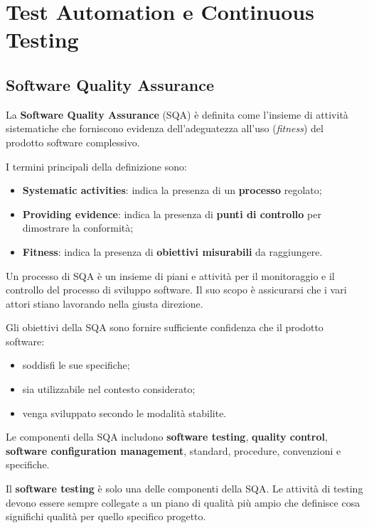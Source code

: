 \chapter{Test Automation e Continuous Testing}

\section{Software Quality Assurance}

La \textbf{Software Quality Assurance} (SQA) è definita come l'insieme di attività sistematiche che forniscono evidenza dell'adeguatezza all'uso (\emph{fitness}) del prodotto software complessivo.

I termini principali della definizione sono:

\begin{itemize}
    \item \textbf{Systematic activities}: indica la presenza di un \textbf{processo} regolato;
    \item \textbf{Providing evidence}: indica la presenza di \textbf{punti di controllo} per dimostrare la conformità;
    \item \textbf{Fitness}: indica la presenza di \textbf{obiettivi misurabili} da raggiungere.
\end{itemize}


\begin{notaprof}
Un processo di SQA è un insieme di piani e attività per il monitoraggio e il controllo del processo di sviluppo software. Il suo scopo è assicurarsi che i vari attori stiano lavorando nella giusta direzione.
\end{notaprof}

Gli obiettivi della SQA sono fornire sufficiente confidenza che il prodotto software:

\begin{itemize}
    \item soddisfi le sue specifiche;
    \item sia utilizzabile nel contesto considerato;
    \item venga sviluppato secondo le modalità stabilite.
\end{itemize}

Le componenti della SQA includono \textbf{software testing}, \textbf{quality control}, \textbf{software configuration management}, standard, procedure, convenzioni e specifiche.

\begin{notaesame}
Il \textbf{software testing} è solo una delle componenti della SQA. Le attività di testing devono essere sempre collegate a un piano di qualità più ampio che definisce cosa significhi qualità per quello specifico progetto.
\end{notaesame}

